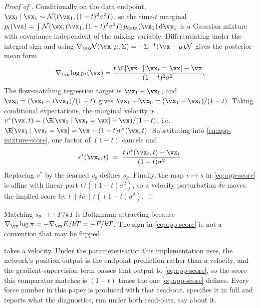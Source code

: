 \begin{proof}[Proof of ]
Conditionally on the data endpoint, $\vx_t \mid \vx_1 \sim
\mathcal{N}(t\vx_1, (1-t)^2\sigma^2 I)$, so the time-$t$ marginal
$p_t(\vx) = \int \mathcal{N}(\vx; t\vx_1, (1-t)^2\sigma^2 I)\,p_{\mathrm{data}}(\vx_1)
\,\mathrm{d}\vx_1$ is a Gaussian mixture with covariance independent of the
mixing variable. Differentiating under the integral sign and using
$\nabla_{\vx}\mathcal{N}(\vx;\mu,\Sigma) = -\Sigma^{-1}(\vx-\mu)\mathcal{N}$ gives
the posterior-mean form
\begin{equation}
  \nabla_{\vx}\log p_t(\vx)
  = \frac{t\,\E[\vx_1 \mid \vx_t = \vx] - \vx}{(1-t)^2\sigma^2}.
  \label{eq:app-mixture-score}
\end{equation}
The flow-matching regression target is $\vx_1 - \vx_0$, and
$\vx_0 = (\vx_t - t\vx_1)/(1-t)$ gives $\vx_1 - \vx_0 = (\vx_1 - \vx_t)/(1-t)$.
Taking conditional expectations, the marginal velocity is
$v^\ast(\vx,t) = (\E[\vx_1\mid \vx_t=\vx] - \vx)/(1-t)$, i.e.
$\E[\vx_1 \mid \vx_t = \vx] = \vx + (1-t)v^\ast(\vx,t)$. Substituting into
\eqref{eq:app-mixture-score}, one factor of $(1-t)$ cancels and
\begin{equation}
  s^\ast(\vx_t,t) \;=\; \frac{t\,v^\ast(\vx_t,t) - \vx_t}{(1-t)\sigma^2}.
  \label{eq:app-score}
\end{equation}
Replacing $v^\ast$ by the learned $v_\theta$ defines $s_\theta$. Finally, the map
$v \mapsto s$ in \eqref{eq:app-score} is affine with linear part
$t/((1-t)\sigma^2)$, so a velocity perturbation $\delta v$ moves the implied
score by $t\|\delta v\|/((1-t)\sigma^2)$.
\end{proof}

\begin{remark}[Sign]
\label{rem:sign}
Matching $s_\theta \to +F/kT$ is Boltzmann-attracting because
$\nabla_{\vx}\log \pi = -\nabla_{\vx}E/kT = +F/kT$. The sign in
\eqref{eq:app-score} is not a convention that may be flipped.
\end{remark}

\begin{remark}
\label{rem:readoutdefect}
 takes a velocity. Under the parameterisation this implementation uses,
the network's position output is the endpoint prediction rather than a velocity, and the
gradient-supervision term passes that output to \eqref{eq:app-score}, so the score this
comparator matches is $(1-t)$ times the one \eqref{eq:app-score} defines. Every force
number in this paper is produced with that read-out.  specifies it in
full and reports what the diagnostics, run under both read-outs, say about it.
\end{remark}

